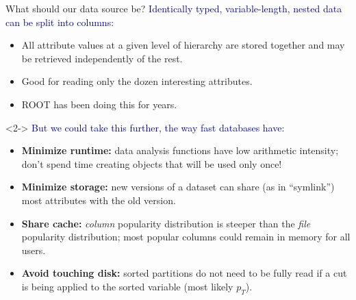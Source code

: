 \documentclass[aspectratio=169]{beamer}
\begin{document}

\begin{frame}{What should our data source be?}
\vspace{0.35 cm}
\textcolor{darkblue}{Identically typed, variable-length, nested data can be split into columns:}
\begin{itemize}
\item All attribute values at a given level of hierarchy are stored together and may be retrieved independently of the rest.
\item Good for reading only the dozen interesting attributes.
\item ROOT has been doing this for years.
\end{itemize}

\begin{uncoverenv}<2->
\vspace{0.25 cm}
\textcolor{darkblue}{But we could take this further, the way fast databases have:}
\begin{itemize}
\item<2-> {\bf Minimize runtime:} data analysis functions have low arithmetic intensity; don't spend time creating objects that will be used only once!
\item<3-> {\bf Minimize storage:} new versions of a dataset can share (as in ``symlink'') most attributes with the old version.
\item<4-> {\bf Share cache:} {\it column} popularity distribution is steeper than the {\it file} popularity distribution; most popular columns could remain in memory for all users.
\item<5-> {\bf Avoid touching disk:} sorted partitions do not need to be fully read if a cut is being applied to the sorted variable (most likely $p_T$).
\end{itemize}
\end{uncoverenv}
\end{frame}
\end{document}
